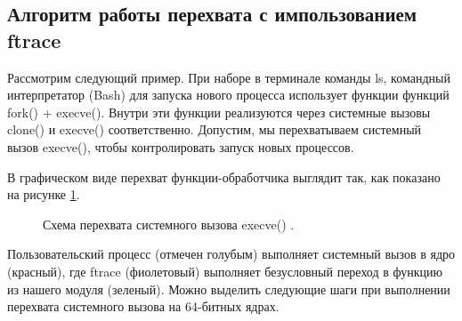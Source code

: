 \documentclass[a4paper,14pt]{article}
\begin{document}
\subsection{Алгоритм работы перехвата с импользованием ftrace}

Рассмотрим следующий пример. При наборе в терминале команды ls, командный интерпретатор (Bash) для запуска нового процесса использует функции функций fork() + execve(). Внутри эти функции реализуются через системные вызовы clone() и execve() соответственно. Допустим, мы перехватываем системный вызов execve(), чтобы контролировать запуск новых процессов.

В графическом виде перехват функции-обработчика выглядит так, как показано на рисунке \ref{fig:lshook}.

\begin{figure}[!h]
    \caption{Схема перехвата системного вызова execve() \cite{ftrace}.}
    \label{fig:lshook}
\end{figure}

Пользовательский процесс (отмечен голубым) выполняет системный вызов в ядро (красный), где ftrace (фиолетовый) выполняет безусловный переход в функцию из нашего модуля (зеленый). Можно выделить следующие шаги при выполнении перехвата системного вызова на 64-битных ядрах.
\end{document}
